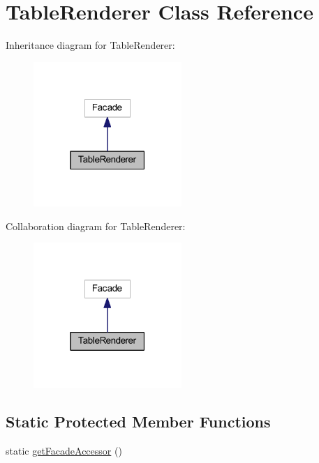 \hypertarget{classhamburgscleanest_1_1_data_tables_1_1_facades_1_1_table_renderer}{}\section{Table\+Renderer Class Reference}
\label{classhamburgscleanest_1_1_data_tables_1_1_facades_1_1_table_renderer}


Inheritance diagram for Table\+Renderer\+:\nopagebreak
\begin{figure}[H]
\begin{center}
\leavevmode
\includegraphics[width=159pt]{classhamburgscleanest_1_1_data_tables_1_1_facades_1_1_table_renderer__inherit__graph}
\end{center}
\end{figure}


Collaboration diagram for Table\+Renderer\+:\nopagebreak
\begin{figure}[H]
\begin{center}
\leavevmode
\includegraphics[width=159pt]{classhamburgscleanest_1_1_data_tables_1_1_facades_1_1_table_renderer__coll__graph}
\end{center}
\end{figure}
\subsection*{Static Protected Member Functions}
\begin{DoxyCompactItemize}
\item 
static \hyperlink{classhamburgscleanest_1_1_data_tables_1_1_facades_1_1_table_renderer_a19a808201f41f32f71a0532cb49b450f}{get\+Facade\+Accessor} ()
\end{DoxyCompactItemize}



